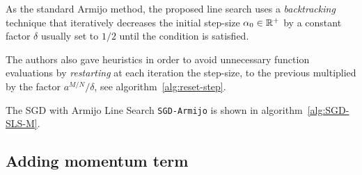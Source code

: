 
As the standard Armijo method, the proposed line search uses a \emph{backtracking} technique that iteratively decreases the initial step-size $\alpha_0\in\mathbb{R}^+$ by a constant factor $\delta$ usually set to $1/2$ until the condition is satisfied.

The authors also gave heuristics in order to avoid unnecessary function evaluations by \emph{restarting} at each iteration the step-size, to the previous multiplied by the factor $a^{M/N}/\delta$, see algorithm~\vref{alg:reset-step}.

The SGD with Armijo Line Search \texttt{SGD-Armijo} is shown in algorithm~\vref{alg:SGD-SLS-M}.

\subsection{Adding momentum term}\label{subsc:sgdm}

